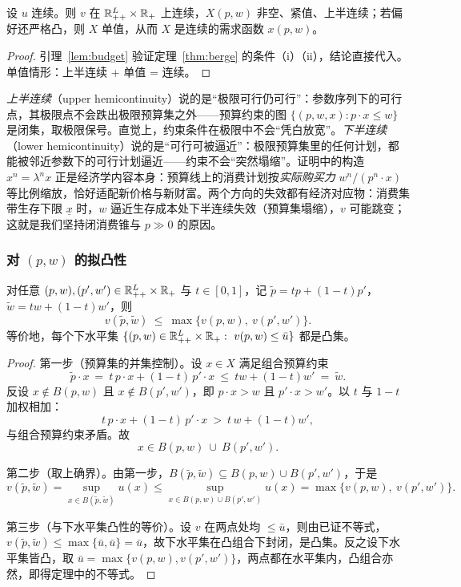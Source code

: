 \begin{corollary}[间接效用的连续性]
\label{cor:cont}
设 $u$ 连续。则 $v$ 在 $\mathbb{R}^L_{++}\times\mathbb{R}_+$ 上连续，$X(p,w)$ 非空、紧值、上半连续；若偏好还严格凸，则 $X$ 单值，从而 $X$ 是连续的需求函数 $x(p,w)$。
\end{corollary}
\begin{proof}
引理~\ref{lem:budget} 验证定理~\ref{thm:berge} 的条件（i）（ii），结论直接代入。单值情形：上半连续 + 单值 = 连续。
\end{proof}

\emph{上半连续}（upper hemicontinuity）说的是“极限可行仍可行”：参数序列下的可行点，其极限点不会跌出极限预算集之外——预算约束的图 $\{(p,w,x):p\cdot x\le w\}$ 是闭集，取极限保号。直觉上，约束条件在极限中不会“凭白放宽”。\emph{下半连续}（lower hemicontinuity）说的是“可行可被逼近”：极限预算集里的任何计划，都能被邻近参数下的可行计划逼近——约束不会“突然塌缩”。证明中的构造 $x^n=\lambda^nx$ 正是经济学内容本身：预算线上的消费计划按\emph{实际购买力} $w^n/(p^n\cdot x)$ 等比例缩放，恰好适配新价格与新财富。两个方向的失效都有经济对应物：消费集带生存下限 $\underline x$ 时，$w$ 逼近生存成本处下半连续失效（预算集塌缩），$v$ 可能跳变；这就是我们坚持闭消费锥与 $p\gg0$ 的原因。

\subsubsection{对 \texorpdfstring{$(p,w)$}{(p,w)} 的拟凸性}

\begin{theorem}[拟凸性]
\label{thm:qvx}
对任意 $(p,w),(p',w')\in\mathbb{R}^L_{++}\times\mathbb{R}_+$ 与 $t\in[0,1]$，记 $\tilde p=tp+(1-t)p'$，$\tilde w=tw+(1-t)w'$，则
\[
v(\tilde p,\tilde w)\ \le\ \max\{v(p,w),\ v(p',w')\}.
\]
等价地，每个下水平集 $\{(p,w)\in\mathbb{R}^L_{++}\times\mathbb{R}_+:\ v(p,w)\le \bar u\}$ 都是凸集。
\end{theorem}
\begin{proof}
第一步（预算集的并集控制）。设 $x\in X$ 满足组合预算约束
\[
\tilde p\cdot x\ =\ t\,p\cdot x+(1-t)\,p'\cdot x\ \le\ tw+(1-t)w'\ =\ \tilde w .
\]
反设 $x\notin B(p,w)$ 且 $x\notin B(p',w')$，即 $p\cdot x>w$ 且 $p'\cdot x>w'$。以 $t$ 与 $1-t$ 加权相加：
\[
t\,p\cdot x+(1-t)\,p'\cdot x\ >\ t\,w+(1-t)w' ,
\]
与组合预算约束矛盾。故
\[
x\in B(p,w)\ \cup\ B(p',w').
\]

第二步（取上确界）。由第一步，$B(\tilde p,\tilde w)\subseteq B(p,w)\cup B(p',w')$，于是
\[
v(\tilde p,\tilde w)
=\sup_{x\in B(\tilde p,\tilde w)}u(x)
\le\sup_{x\in B(p,w)\cup B(p',w')}u(x)
=\max\{v(p,w),\ v(p',w')\}.
\]

第三步（与下水平集凸性的等价）。设 $v$ 在两点处均 $\le\bar u$，则由已证不等式，$v(\tilde p,\tilde w)\le\max\{\bar u,\bar u\}=\bar u$，故下水平集在凸组合下封闭，是凸集。反之设下水平集皆凸，取 $\bar u=\max\{v(p,w),v(p',w')\}$，两点都在水平集内，凸组合亦然，即得定理中的不等式。
\end{proof}

